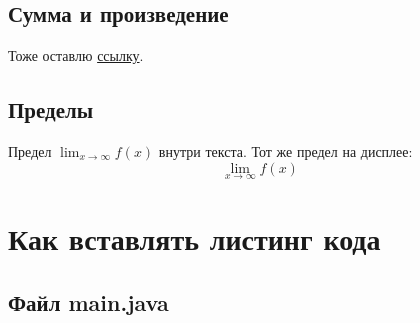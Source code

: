     \subsection{Сумма и произведение}
    Тоже оставлю \href{https://www.overleaf.com/learn/latex/Integrals,_sums_and_limits#Sums_and_products}{ссылку}.
    
    \subsection{Пределы}
    
    Предел \(\lim_{x\to\infty} f(x)\) внутри текста.
    Тот же предел на дисплее:
    \[
    \lim_{x\to\infty} f(x)
    \]

\section{Как вставлять листинг кода}





\subsection*{Файл main.java}






    
    
